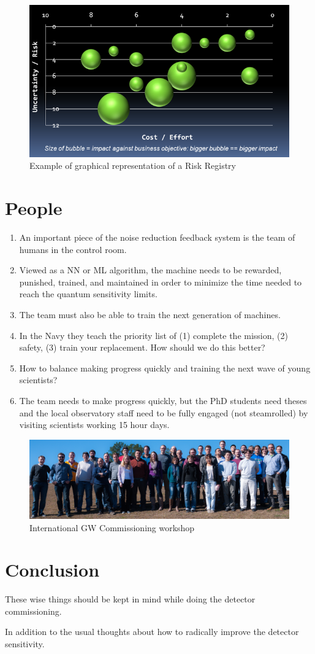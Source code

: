 \begin{figure}[h]
\centering
\includegraphics[width=\columnwidth]{Figures/RIPBubbleChartNoOverlays.png}
\caption{Example of graphical representation of a Risk Registry}
\label{fig:RiskBubbles}
\end{figure}


\section{People}
\begin{enumerate}
\item An important piece of the noise reduction feedback system is the team of humans 
  in the control room.
\item Viewed as a NN or ML algorithm, the machine needs to be rewarded, punished, trained, and 
  maintained in order to minimize the time needed to reach the quantum sensitivity limits.
\item The team must also be able to train the next generation of machines.
\item In the Navy they teach the priority list of (1) complete the mission, 
  (2) safety, (3) train your replacement. How should we do this better?
\item How to balance making progress quickly and training the next wave of young scientists?
\item The team needs to make progress quickly, but the PhD students need theses and the local
  observatory staff need to be fully engaged (not steamrolled) by visiting scientists working 15 hour days.
\end{enumerate}

\begin{figure}[h]
\centering
\includegraphics[width=\columnwidth]{Figures/GroupPhoto_LLOworkshop13.jpg}
\caption{International GW Commissioning workshop}
\label{fig:workshopPhotoLLO}
\end{figure}

\section{Conclusion}
These wise things should be kept in mind while doing the detector commissioning.

In addition to the usual thoughts about how to radically improve the detector sensitivity.



